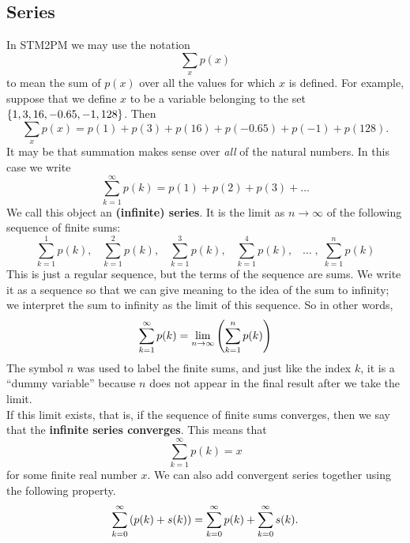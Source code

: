 \subsection{Series} \label{sec415}
In STM2PM we may use the notation \label{symbsumxp(x)}
\[
\sum_xp(x)
\]
to mean the sum of $p(x)$ over all the values for which $x$ is defined. For example, suppose that we define $x$ to be a variable belonging to the set $\left\{1,3,16,-0.65,-1,128\right\}$. Then 
\[
\sum_xp(x) = p(1) + p(3) + p(16) + p(-0.65) + p(-1) + p(128).
\]
It may be that summation makes sense over \textit{all} of the natural numbers. In this case we write
\[
\sum_{k=1}^\infty p(k) = p(1) + p(2) + p(3) + \ldots
\]
We call this object an \textbf{(infinite) series}. It is the limit as $n \rightarrow \infty$ of the following sequence of finite sums:
\[
\sum_{k=1}^1 p(k), \;\;\; \sum_{k=1}^2 p(k), \;\;\; \sum_{k=1}^3 p(k), \;\;\; \sum_{k=1}^4 p(k), \;\;\; \ldots \;, \; \sum_{k=1}^n p(k)
\]
This is just a regular sequence, but the terms of the sequence are sums. We write it as a sequence so that we can give meaning to the idea of the sum to infinity; we interpret the sum to infinity as the limit of this sequence. So in other words, \label{symbolsuminfty}
\[
\sum_{k=1}^\infty p(k) = \lim_{n \rightarrow \infty}\left(\sum_{k=1}^np(k)\right)
\]
The symbol $n$ was used to label the finite sums, and just like the index $k$, it is a ``dummy variable'' because $n$ does not appear in the final result after we take the limit. \\

\noindent If this limit exists, that is, if the sequence of finite sums converges, then we say that the \textbf{infinite series converges}. This means that \label{infinite series} \label{infinite series convergence}
\[
\sum_{k=1}^\infty p(k) = x
\]
for some finite real number $x$. We can also add convergent series together using the following property.
\[
\sum_{k=0}^\infty \left(p(k) + s(k)\right) = \sum_{k=0}^\infty p(k) + \sum_{k=0}^\infty s(k).
\]

